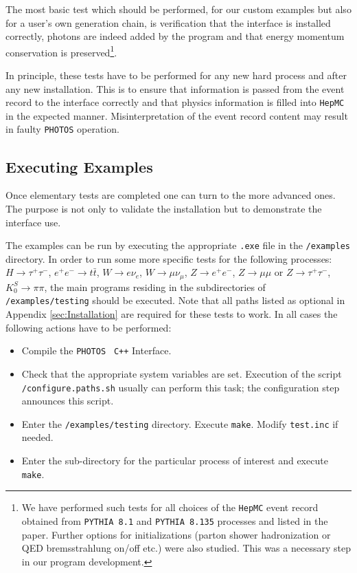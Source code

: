 \documentclass[]{Photos_interface_design}
\begin{document}
The most basic test which should be performed, for our custom examples but also for a user's own generation chain, 
 is verification that the interface is installed correctly, 
photons are indeed added by the program and that energy momentum 
conservation is preserved\footnote{
We have  performed such  tests for all choices of the {\tt HepMC} event record obtained 
from  {\tt PYTHIA 8.1} and {\tt PYTHIA 8.135} processes and 
listed in the paper. Further  options for initializations 
(parton shower hadronization or QED bremsstrahlung on/off etc.) were also studied.
This was a necessary step in our program development.}.

In principle, these tests have to be performed for any new hard 
process and after any new installation. This is to ensure that 
information is passed from the event record to the interface 
correctly and that physics information is filled into {\tt HepMC} 
in the expected manner. Misinterpretation of the event record content may result in 
faulty {\tt PHOTOS} operation.


\subsection{Executing Examples}

Once elementary tests are completed one can turn to the more advanced ones.
The purpose is not only to validate the installation but to demonstrate the
interface use.

The examples can be run by executing the appropriate {\tt .exe} file in the {\tt /examples} directory.
In order to run some more specific tests for the following processes:
$H \rightarrow \tau^+ \tau^-$, $ e^+ e^- \rightarrow t \bar t$,
$W \rightarrow e \nu_e$, $W \rightarrow \mu \nu_\mu$,
$Z \rightarrow e^+ e^-$, $Z \rightarrow \mu \mu$ or $Z \rightarrow \tau^+ \tau^-$,
$K_{0}^{S} \rightarrow \pi \pi$,
the main programs residing in the subdirectories of {\tt /examples/testing} should be executed.
Note that all paths listed as optional in Appendix \ref{sec:Installation} are required for these
tests to work.
In all cases the following actions have to be performed:

\begin{itemize}
  \item Compile the {\tt PHOTOS } {\tt C++} Interface. 
 \item  Check that the appropriate system variables are set. Execution of  the script \\
{\tt /configure.paths.sh} usually can perform this task; the configuration step 
announces this script.
  \item Enter the {\tt /examples/testing} directory. Execute {\tt make}. 
Modify {\tt test.inc} if needed.
  \item Enter the sub-directory for the particular process of interest
and execute {\tt make}.
\end{itemize}
\end{document}
